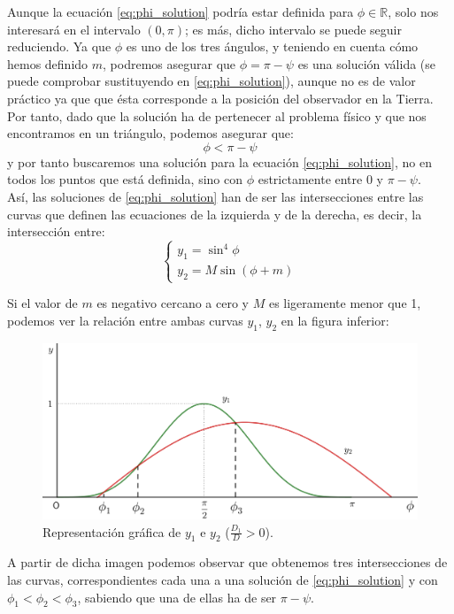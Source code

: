\documentclass[11pt]{article}
\begin{document}
Aunque la ecuación \eqref{eq:phi_solution} podría estar definida para $\phi\in\mathbb{R}$, solo nos interesará en el intervalo $(0,\pi)$; es más, dicho intervalo se puede seguir reduciendo. Ya que $\phi$ es uno de los tres ángulos, y teniendo en cuenta cómo hemos definido $m$, podremos asegurar que $\phi=\pi-\psi$ es una solución válida (se puede comprobar sustituyendo en \eqref{eq:phi_solution}), aunque no es de valor práctico ya que que ésta corresponde a la posición del observador en la Tierra. Por tanto, dado que la solución ha de pertenecer al problema físico y que nos encontramos en un triángulo, podemos asegurar que:
\[
\phi<\pi-\psi
\]
\noindent y por tanto buscaremos una solución para la ecuación \eqref{eq:phi_solution}, no en todos los puntos que está definida, sino con $\phi$ estrictamente entre 0 y $\pi-\psi$.\\

Así, las soluciones de \eqref{eq:phi_solution} han de ser las intersecciones entre las curvas que definen las ecuaciones de la izquierda y de la derecha, es decir, la intersección entre:
\[
\left\{
\begin{array}{l}
	y_1=\sin^4{\phi}\\
	y_2=M\sin{(\phi+m)}
\end{array}
\right.
\]

Si el valor de $m$ es negativo cercano a cero y $M$ es ligeramente menor que 1, podemos ver la relación entre ambas curvas $y_1$, $y_2$ en la figura inferior:

\begin{figure}[H]
\centering
\includegraphics[scale=0.125]{images/phi_solution_m_negative_M_near_1.png}
\caption{Representación gráfica de $y_1$ e $y_2$ ($\frac{D_1}{D}>0$).}
\label{fig:phi_solution_m_negative_M_near_1}
\end{figure}

A partir de dicha imagen podemos observar que obtenemos tres intersecciones de las curvas, correspondientes cada una a una solución de \eqref{eq:phi_solution} y con $\phi_1<\phi_2<\phi_3$, sabiendo que una de ellas ha de ser $\pi-\psi$.\\
\end{document}
